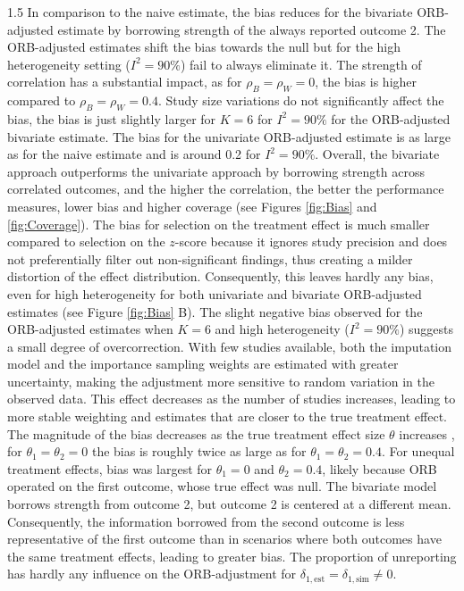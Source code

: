 \documentclass{article}
\begin{document}
\begin{spacing}{1.5}
In comparison to the naive estimate, the bias reduces for the bivariate ORB-adjusted estimate by borrowing strength of the always reported outcome 2. The ORB-adjusted estimates shift the bias towards the null but for the high heterogeneity setting ($I^2 = 90\%$) fail to always eliminate it. The strength of correlation has a substantial impact, as for $\rho_B = \rho_W = 0$, the bias is higher compared to $\rho_B = \rho_W = 0.4$. Study size variations do not significantly affect the bias, the bias is just slightly larger for $K = 6$ for $I^2 = 90\%$ for the ORB-adjusted bivariate estimate. The bias for the univariate ORB-adjusted estimate is as large as for the naive estimate and is around 0.2 for $I^2 = 90\%$. Overall, the bivariate approach outperforms the univariate approach by borrowing strength across correlated outcomes, and the higher the correlation, the better the performance measures, \ie lower bias and higher coverage (see Figures \ref{fig:Bias} and \ref{fig:Coverage}). The bias for selection on the treatment effect is much smaller compared to selection on the $z$-score because it ignores study precision and does not preferentially filter out non-significant findings, thus creating a milder distortion of the effect distribution. Consequently, this leaves hardly any bias, even for high heterogeneity for both univariate and bivariate ORB-adjusted estimates (see Figure \ref{fig:Bias} B).
The slight negative bias observed for the ORB-adjusted estimates when $K = 6$ and high heterogeneity ($I^2 = 90\%$) suggests a small degree of overcorrection. With few studies available, both the imputation model and the importance sampling weights are estimated with greater uncertainty, making the adjustment more sensitive to random variation in the observed data. This effect decreases as the number of studies increases, leading to more stable weighting and estimates that are closer to the true treatment effect. The magnitude of the bias decreases as the true treatment effect size $\theta$ increases \cite{copas2019model, van2024correcting, saracini2025addressing}, \ie for $\theta_1 = \theta_2 = 0$ the bias is roughly twice as large as for $\theta_1 = \theta_2 = 0.4$. For unequal treatment effects, bias was largest for $\theta_1 = 0$ and $\theta_2 = 0.4$, likely because ORB operated on the first outcome, whose true effect was null. The bivariate model borrows strength from outcome 2, but outcome 2 is centered at a different mean. Consequently, the information borrowed from the second outcome is less representative of the first outcome than in scenarios where both outcomes have the same treatment effects, leading to greater bias. The proportion of unreporting has hardly any influence on the ORB-adjustment for $\delta_{1,\text{est}} = \delta_{1,\text{sim}} \neq 0$. 


\end{spacing}
\end{document}
